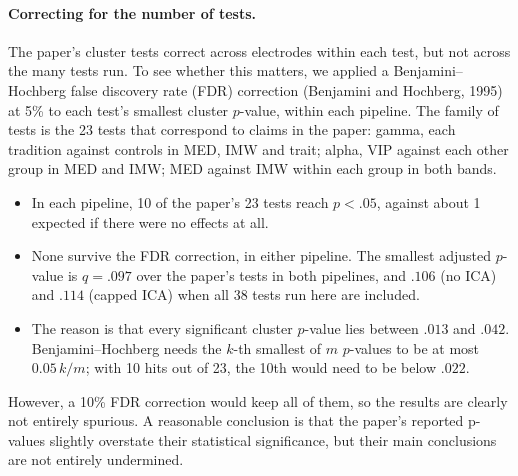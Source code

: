 \documentclass[10pt,a4paper]{article}
\begin{document}
\paragraph{Correcting for the number of tests.} The paper's cluster tests correct across electrodes within each
test, but not across the many tests run. To see whether this matters, we applied a Benjamini--Hochberg false
discovery rate (FDR) correction (Benjamini and Hochberg, 1995) at 5\% to each test's smallest cluster $p$-value, within each pipeline. 
The family of tests is the 23 tests that correspond to claims in the paper: gamma, each
tradition against controls in MED, IMW and trait; alpha, VIP against each other group in MED and IMW; MED against
IMW within each group in both bands.
\begin{itemize}
  \item In each pipeline, 10 of the paper's 23 tests reach $p < .05$, against about 1 expected if there were no
        effects at all.
  \item None survive the FDR correction, in either pipeline. The smallest adjusted $p$-value is $q = .097$
        over the paper's tests in both pipelines, and $.106$ (no ICA) and $.114$ (capped ICA) when all 38 tests run here
        are included.
  \item The reason is that every significant cluster $p$-value lies between $.013$ and $.042$. Benjamini--Hochberg
        needs the $k$-th smallest of $m$ $p$-values to be at most $0.05\,k/m$; with 10 hits out of 23, the 10th
        would need to be below $.022$.
\end{itemize}
However, a 10\% FDR correction would keep all of them, so the results are clearly not entirely spurious. A reasonable
conclusion is that the paper's reported p-values slightly overstate their statistical significance, but
their main conclusions are not entirely undermined.
\end{document}
